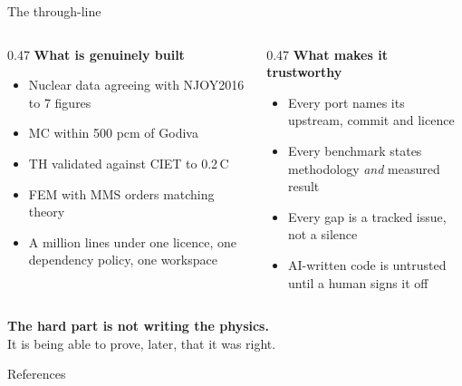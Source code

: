 \documentclass[aspectratio=169,11pt]{beamer}
\begin{document}
\begin{frame}{The through-line}
  \begin{columns}[T]
    \begin{column}{0.47\textwidth}
      \textbf{What is genuinely built}
      \begin{itemize}
        \item Nuclear data agreeing with NJOY2016 to 7 figures
        \item MC within 500 pcm of Godiva
        \item TH validated against CIET to 0.2\,\textdegree C
        \item FEM with MMS orders matching theory
        \item A million lines under one licence, one dependency policy, one workspace
      \end{itemize}
    \end{column}
    \begin{column}{0.47\textwidth}
      \textbf{What makes it trustworthy}
      \begin{itemize}
        \item Every port names its upstream, commit and licence
        \item Every benchmark states methodology \emph{and} measured result
        \item Every gap is a tracked issue, not a silence
        \item AI-written code is untrusted until a human signs it off
      \end{itemize}
    \end{column}
  \end{columns}
  \vspace{1.2em}
  \begin{center}
    \alert{\textbf{The hard part is not writing the physics.}} \\
    \vspace{0.3em}
    It is being able to prove, later, that it was right.
  \end{center}
\end{frame}

\begin{frame}[allowframebreaks]{References}
  \footnotesize
  
  
\end{frame}
\end{document}
